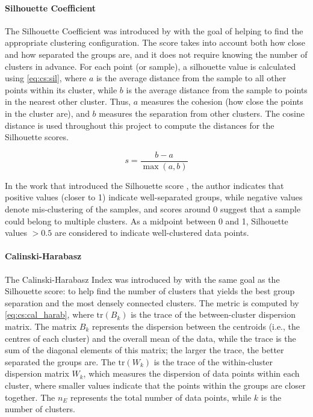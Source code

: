 \paragraph*{Silhouette Coefficient} \label{s:lit:silhouette}

The Silhouette Coefficient was introduced by \citet{Rousseeuw1987-wy} with the goal of helping to find the appropriate clustering configuration. The score takes into account both how close and how separated the groups are, and it does not require knowing the number of clusters in advance. For each point (or sample), a silhouette value is calculated using \cref{eq:cs:sil}, where \(a\) is the average distance from the sample to all other points within its cluster, while \(b\) is the average distance from the sample to points in the nearest other cluster. Thus, \(a\) measures the cohesion (how close the points in the cluster are), and \(b\) measures the separation from other clusters. The cosine distance is used throughout this project to compute the distances for the Silhouette scores.

\begin{equation} \label{eq:cs:sil}
    s = \frac{b - a}{\max(a, b)}
\end{equation}

In the work that introduced the Silhouette score \citep{Rousseeuw1987-wy}, the author indicates that positive values (closer to 1) indicate well-separated groups, while negative values denote mis-clustering of the samples, and scores around 0 suggest that a sample could belong to multiple clusters. As a midpoint between 0 and 1, Silhouette values \(>0.5\) are considered to indicate well-clustered data points.


\paragraph*{Calinski-Harabasz} \label{s:lit:cal_harab}


The Calinski-Harabasz Index was introduced by \citet{Calinski1974-uu} with the same goal as the Silhouette score: to help find the number of clusters that yields the best group separation and the most densely connected clusters. The metric is computed by \cref{eq:cs:cal_harab}, where \(\mathrm{tr}(B_k)\) is the trace of the between-cluster dispersion matrix. The matrix \(B_k\) represents the dispersion between the centroids (i.e., the centres of each cluster) and the overall mean of the data, while the trace is the sum of the diagonal elements of this matrix; the larger the trace, the better separated the groups are. The \(\mathrm{tr}(W_k)\) is the trace of the within-cluster dispersion matrix \(W_k\), which measures the dispersion of data points within each cluster, where smaller values indicate that the points within the groups are closer together. The \(n_E\) represents the total number of data points, while \(k\) is the number of clusters.

